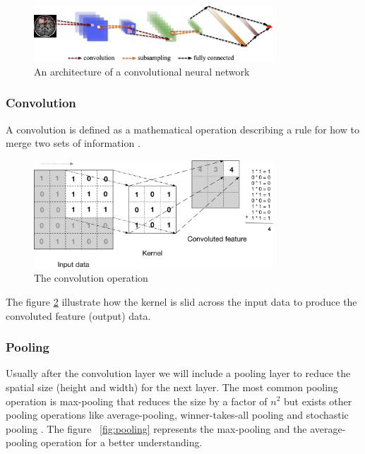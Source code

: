 \begin{figure}[H]
\centering
\includegraphics[width=0.8\textwidth]{./figures/cnn}
\caption{An architecture of a convolutional neural network}
\label{fig:cnn}
\end{figure}

\subsubsection[Convolution]{Convolution}

A convolution is defined as a mathematical operation describing a rule for how to merge two sets of information \cite{starteddeeplearning}.

\begin{figure}[H]
\centering
\includegraphics[width=0.8\textwidth]{./figures/convolution}
\caption{The convolution operation \cite{rajalingappaa}}
\label{fig:convolution}
\end{figure}

The figure \ref{fig:convolution} illustrate how the kernel is slid across the input data to produce the convoluted feature (output) data. 

\subsubsection[Pooling]{Pooling}

Usually after the convolution layer we will include a pooling layer to reduce the spatial size \cite{starteddeeplearning} (height and width) for the next layer. 
The most common pooling operation is max-pooling that reduces the size by a factor of $n^2$ \cite{greenspan} but exists other pooling operations like average-pooling, winner-takes-all pooling \cite{advancesneuralinformation} and stochastic pooling \cite{stochastic}. The figure ~\ref{fig:pooling} represents the max-pooling and the average-pooling operation for a better understanding.

